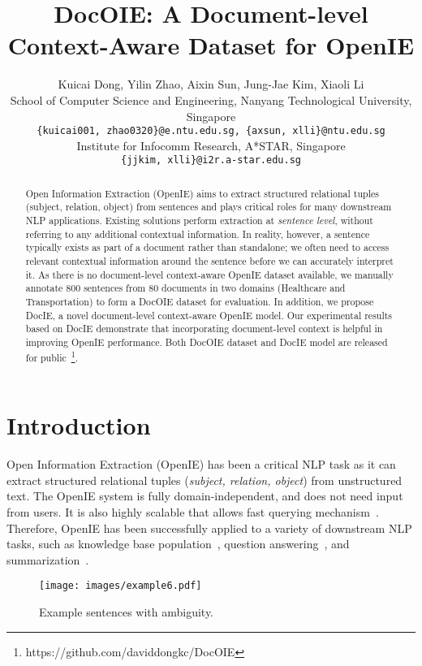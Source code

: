 \documentclass[11pt,a4paper]{article}
\title{DocOIE: A Document-level Context-Aware Dataset for OpenIE}
\author{Kuicai Dong, Yilin Zhao, Aixin Sun, Jung-Jae Kim, Xiaoli Li \\

School of Computer Science and Engineering, Nanyang Technological University, Singapore\\
\texttt{\{kuicai001, zhao0320\}@e.ntu.edu.sg, \{axsun, xlli\}@ntu.edu.sg}\\
Institute for Infocomm Research, A*STAR, Singapore\\
\texttt{\{jjkim, xlli\}@i2r.a-star.edu.sg}}
\date{}
\begin{document}
\maketitle

\begin{abstract}
Open Information Extraction (OpenIE) aims to extract structured relational tuples (subject, relation, object) from sentences and plays critical roles for many downstream NLP applications. Existing solutions perform extraction at \textit{sentence level}, without referring to any additional contextual information. In reality, however, a sentence typically exists as part of a document rather than standalone; we often need to access relevant contextual information around the sentence before we can accurately interpret it.
As there is no document-level context-aware OpenIE dataset available, we manually annotate 800 sentences from 80 documents in two domains (Healthcare and Transportation) to form a DocOIE dataset for evaluation.
In addition, we propose DocIE, a novel document-level context-aware OpenIE model. Our experimental results based on DocIE demonstrate that incorporating document-level context is helpful in improving OpenIE performance. Both DocOIE dataset and DocIE model are released for public~\footnote{https://github.com/daviddongkc/DocOIE}.

\end{abstract}




\section{Introduction}
\label{sec:intro}


Open Information Extraction (OpenIE) has been a critical NLP task as it can extract structured relational tuples (\textit{subject, relation, object}) from unstructured text. The OpenIE system is fully domain-independent, and does not need input from users. It is also highly scalable that allows fast querying mechanism~\cite{yates2007textrunner}. Therefore, OpenIE has been successfully applied to a variety of downstream NLP tasks, such as knowledge base population~\cite{martinez2018openie, gashteovski2020aligning}, question answering~\cite{khot2017answering}, and summarization~\cite{fan2019using}.

\begin{figure}[th]
    \centering
    \texttt{[image: images/example6.pdf]}
    \vspace{-0.5em}
    \caption{Example sentences with ambiguity.}
    \vspace{-0.5em}
    \label{fig:example}
\end{figure}
\end{document}
